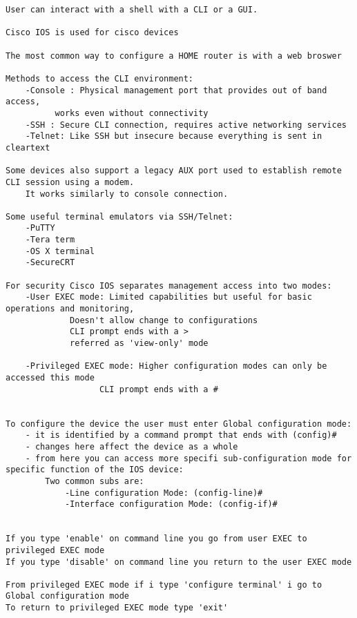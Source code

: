 \documentclass[../EngineeringJournal_CDavis.tex]{subfiles}
\begin{document}
\hspace{0.2cm}
\begin{tcolorbox}[width=6.3in]
\scriptsize 
\begin{verbatim}
User can interact with a shell with a CLI or a GUI.

Cisco IOS is used for cisco devices

The most common way to configure a HOME router is with a web broswer

Methods to access the CLI environment:
	-Console : Physical management port that provides out of band access, 
		  works even without connectivity
	-SSH : Secure CLI connection, requires active networking services
	-Telnet: Like SSH but insecure because everything is sent in cleartext

Some devices also support a legacy AUX port used to establish remote CLI session using a modem.
	It works similarly to console connection.

Some useful terminal emulators via SSH/Telnet:
	-PuTTY
	-Tera term
	-OS X terminal
	-SecureCRT

For security Cisco IOS separates management access into two modes:
	-User EXEC mode: Limited capabilities but useful for basic operations and monitoring,
			 Doesn't allow change to configurations
			 CLI prompt ends with a >
			 referred as 'view-only' mode
	
	-Privileged EXEC mode: Higher configuration modes can only be accessed this mode
			       CLI prompt ends with a #
				

To configure the device the user must enter Global configuration mode:
	- it is identified by a command prompt that ends with (config)#
	- changes here affect the device as a whole
	- from here you can access more specifi sub-configuration mode for specific function of the IOS device:
		Two common subs are:
			-Line configuration Mode: (config-line)#
			-Interface configuration Mode: (config-if)#


If you type 'enable' on command line you go from user EXEC to privileged EXEC mode
If you type 'disable' on command line you return to the user EXEC mode

From privileged EXEC mode if i type 'configure terminal' i go to Global configuration mode
To return to privileged EXEC mode type 'exit'
\end{verbatim}
\end{tcolorbox}
\hspace{0.2cm}
\normalsize  
\end{document}
